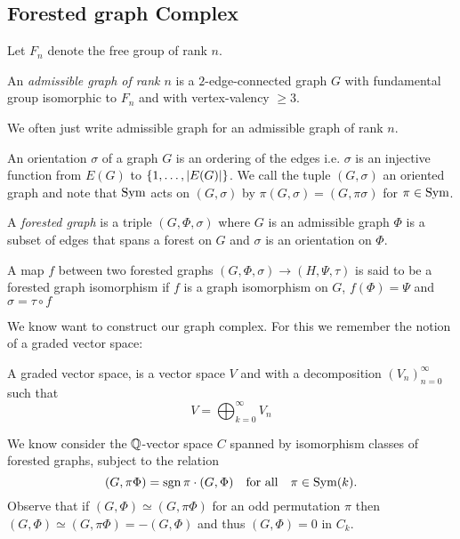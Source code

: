 \subsection{Forested graph Complex}
Let $F_{n}$ denote the free group of rank $n.$
\begin{definition}
	An \emph{admissible graph of rank $n$} is a $2$-edge-connected graph $G$ with fundamental group isomorphic to $F_{n}$ and with vertex-valency $\geq 3$.
\end{definition}


We often just write admissible graph for an admissible graph of rank $n$.

\begin{definition}
	An orientation $\sigma$ of a graph $G$ is an ordering of the edges i.e. $\sigma$ is an injective function from $E(G)$ to $\{1,\ldots,\abs{E(G)}\}$.
	We call the tuple $(G,\sigma)$ an oriented graph and note that $\operatorname{Sym}$ acts on $(G,\sigma)$ by $\pi (G,\sigma) = (G,\pi \sigma)$ for $\pi \in \operatorname{Sym}$.
\end{definition}

\begin{definition}
	A \emph{forested graph} is a triple $(G,\Phi,\sigma)$ where $G$ is an admissible graph $\Phi$ is a subset of edges that spans a forest on $G$ and 
	$\sigma$ is an orientation on $\Phi$.

	A map $f$ between two forested graphs $(G,\Phi, \sigma) \to (H,\Psi, \tau)$ is said to be a forested graph isomorphism if 
	$f$ is a graph isomorphism on $G$,  $f(\Phi) = \Psi$ and $\sigma = \tau \circ f $
\end{definition}

We know want to construct our graph complex. For this we remember the notion of a graded vector space:
\begin{definition}
	A graded vector space, is a vector space $V$ and with a decomposition $\left(V_{n}\right)^{\infty}_{n=0} $ such that
	\[
		V = \bigoplus_{k=0}^{\infty} V_{n}
	\] 
\end{definition}

We know consider the $\mathbb{Q}$-vector space $C$ spanned by isomorphism classes of forested graphs, subject to the relation
\[
	(G,\pi \Phi) = \sgn{\pi} \cdot (G,\Phi) \qq{for all} \pi \in \on{Sym}(k)
.\]
Observe that if $(G,\Phi) \simeq (G,\pi \Phi)$ for an odd permutation $\pi$ then $(G,\Phi) \simeq (G,\pi \Phi) = - (G,\Phi)$ and thus $(G,\Phi) = 0$ in  $C_{k}$.

